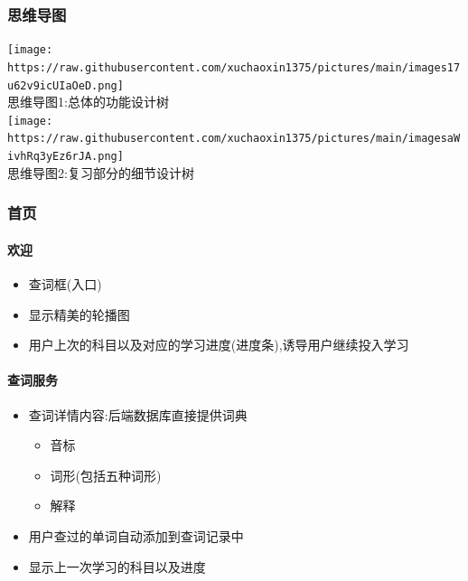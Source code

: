 \documentclass[
]{article}
\begin{document}
\hypertarget{ux601dux7ef4ux5bfcux56fe}{%
\subsubsection{思维导图}\label{ux601dux7ef4ux5bfcux56fe}}

\texttt{[image: https://raw.githubusercontent.com/xuchaoxin1375/pictures/main/images17u62v9icUIaOeD.png]}\\
思维导图1:总体的功能设计树\\
\texttt{[image: https://raw.githubusercontent.com/xuchaoxin1375/pictures/main/imagesaWivhRq3yEz6rJA.png]}\\
思维导图2:复习部分的细节设计树

\hypertarget{ux9996ux9875-1}{%
\subsubsection{首页}\label{ux9996ux9875-1}}

\hypertarget{ux6b22ux8fce}{%
\paragraph{欢迎}\label{ux6b22ux8fce}}

\begin{itemize}
\item
  查词框(入口)
\item
  显示精美的轮播图
\item
  用户上次的科目以及对应的学习进度(进度条),诱导用户继续投入学习
\end{itemize}

\hypertarget{ux67e5ux8bcdux670dux52a1}{%
\paragraph{查词服务}\label{ux67e5ux8bcdux670dux52a1}}

\begin{itemize}
\item
  查词详情内容:后端数据库直接提供词典

  \begin{itemize}
  \item
    音标
  \item
    词形(包括五种词形)
  \item
    解释
  \end{itemize}
\end{itemize}

\begin{itemize}
\item
  用户查过的单词自动添加到查词记录中
\item
  显示上一次学习的科目以及进度
\end{itemize}
\end{document}
